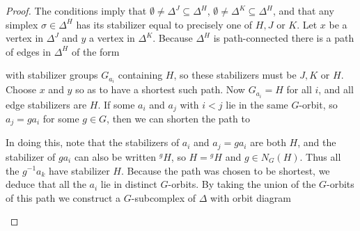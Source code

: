 \documentclass[12pt]{amsart}
\theoremstyle{plain}
\theoremstyle{definition}
\theoremstyle{remark}
\numberwithin{equation}{section}
\begin{document}
\begin{proof}
The conditions imply that $\emptyset\ne \Delta^J\subseteq\Delta^H$, $\emptyset\ne \Delta^K\subseteq\Delta^H$, and that any simplex $\sigma\in\Delta^H$ has its stabilizer equal to precisely one of $H,J$ or $K$. Let $x$ be a vertex in $\Delta^J$ and $y$ a vertex in $\Delta^K$. Because $\Delta^H$ is path-connected there is a path of edges in $\Delta^H$ of the form
\begin{center}    
\end{center}
     with stabilizer groups $G_{a_i}$ containing $H$, so these stabilizers must be $J,K$ or $H$. Choose $x$ and $y$ so as to have a shortest such path. Now $G_{a_i}=H$ for all $i$, and all edge stabilizers are $H$. If some $a_i$ and $a_j$ with $i<j$ lie in the same $G$-orbit, so $a_j=ga_i$ for some $g\in G$, then we can shorten the path to
\begin{center}    
\end{center}
    In doing this, note that the stabilizers of $a_i$ and $a_j=ga_i$ are both $H$, and the stabilizer of $ga_i$ can also be written ${}^gH$, so $H={}^gH$ and $g\in N_G(H)$. Thus all the $g^{-1}a_k$ have stabilizer $H$.
    Because the path was chosen to be shortest, we deduce that all the $a_i$ lie in distinct $G$-orbits. By taking the union of the $G$-orbits of this path we construct a $G$-subcomplex of $\Delta$ with orbit diagram
\begin{center}
\begin{tikzpicture}

\end{tikzpicture}
\end{center}
\end{proof}
\end{document}
